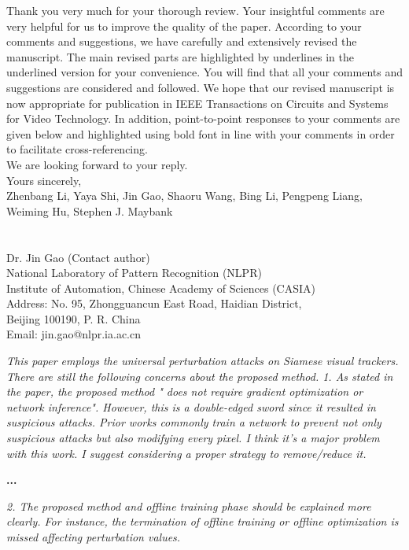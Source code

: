 \documentclass[12pt]{article}
\begin{document}
Thank you very much for your thorough review. Your insightful comments are very helpful for us to improve the quality of the paper. According to your comments and suggestions, we have carefully and extensively revised the manuscript. The main revised parts are highlighted by underlines in the underlined version for your convenience. You will find that all your comments and suggestions are considered and followed. We hope that our revised manuscript is now appropriate for publication in IEEE Transactions on Circuits and Systems for Video Technology.
In addition, point-to-point responses to your comments are given below and highlighted using bold font in line with your comments in order to facilitate cross-referencing.\\[10pt]
\indent We are looking forward to your reply.\\[10pt]
\noindent Yours sincerely,\\
\noindent Zhenbang Li, Yaya Shi, Jin Gao, Shaoru Wang, Bing Li, Pengpeng Liang, Weiming Hu, Stephen J. Maybank
\\
\\
\\
\noindent Dr. Jin Gao (Contact author)\\
\noindent National Laboratory of Pattern Recognition (NLPR)\\
\noindent Institute of Automation, Chinese Academy of Sciences (CASIA)\\
\noindent Address: No. 95, Zhongguancun East Road, Haidian District,\\
\noindent Beijing 100190, P. R. China\\
\noindent Email: jin.gao@nlpr.ia.ac.cn

\newpage

\textit{This paper employs the universal perturbation attacks on Siamese visual trackers. There are still the following concerns about the proposed method. 1. As stated in the paper, the proposed method " does not require gradient optimization or network inference". However, this is a double-edged sword since it resulted in suspicious attacks. Prior works commonly train a network to prevent not only suspicious attacks but also modifying every pixel. I think it's a major problem with this work. I suggest considering a proper strategy to remove/reduce it.}

\textbf{...}

\textit{2. The proposed method and offline training phase should be explained more clearly. For instance, the termination of offline training or offline optimization is missed affecting perturbation values.}
\end{document}
